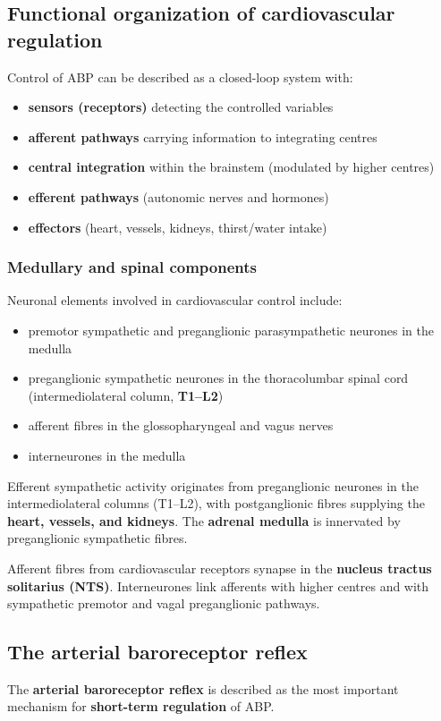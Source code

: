 \documentclass[11pt,a4paper]{article}
\begin{document}
\subsection{Functional organization of cardiovascular regulation}
Control of ABP can be described as a closed-loop system with:
\begin{itemize}
\item \textbf{sensors (receptors)} detecting the controlled variables
\item \textbf{afferent pathways} carrying information to integrating centres
\item \textbf{central integration} within the brainstem (modulated by higher centres)
\item \textbf{efferent pathways} (autonomic nerves and hormones)
\item \textbf{effectors} (heart, vessels, kidneys, thirst/water intake)
\end{itemize}

\subsubsection{Medullary and spinal components}
Neuronal elements involved in cardiovascular control include:
\begin{itemize}
\item premotor sympathetic and preganglionic parasympathetic neurones in the medulla
\item preganglionic sympathetic neurones in the thoracolumbar spinal cord (intermediolateral column, \textbf{T1--L2})
\item afferent fibres in the glossopharyngeal and vagus nerves
\item interneurones in the medulla
\end{itemize}

Efferent sympathetic activity originates from preganglionic neurones in the intermediolateral columns (T1--L2), with postganglionic fibres supplying the \textbf{heart, vessels, and kidneys}. The \textbf{adrenal medulla} is innervated by preganglionic sympathetic fibres.

Afferent fibres from cardiovascular receptors synapse in the \textbf{nucleus tractus solitarius (NTS)}. Interneurones link afferents with higher centres and with sympathetic premotor and vagal preganglionic pathways.

\subsection{The arterial baroreceptor reflex}
The \textbf{arterial baroreceptor reflex} is described as the most important mechanism for \textbf{short-term regulation} of ABP.
\end{document}
